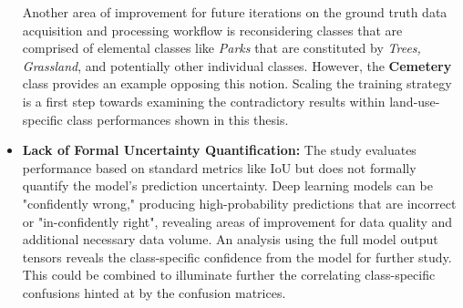 \documentclass{report}
\begin{document}
\begin{itemize}
\par
Another area of improvement for future iterations on the ground truth data acquisition and processing workflow is reconsidering classes that are comprised of elemental classes like \textit{Parks} that are constituted by \textit{Trees, Grassland}, and potentially other individual classes. However, the \textbf{Cemetery} class provides an example opposing this notion. Scaling the training strategy is a first step towards examining the contradictory results within land-use-specific class performances shown in this thesis.
\item \textbf{Lack of Formal Uncertainty Quantification:} The study evaluates performance based on standard metrics like IoU but does not formally quantify the model's prediction uncertainty. Deep learning models can be "confidently wrong," producing high-probability predictions that are incorrect or "in-confidently right", revealing areas of improvement for data quality and additional necessary data volume. An analysis using the full model output tensors reveals the class-specific confidence from the model for further study. This could be combined to illuminate further the correlating class-specific confusions hinted at by the confusion matrices.
\end{itemize}
\end{document}
